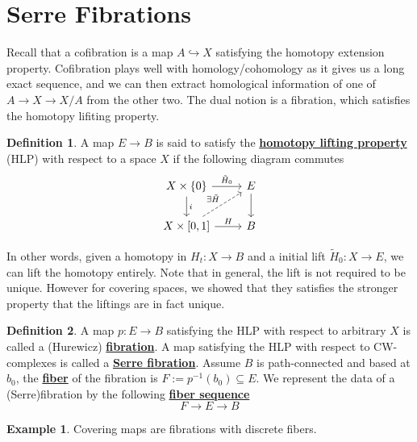 \documentclass{article}
\theoremstyle{definition}
\theoremstyle{definition}
\theoremstyle{definition}
\theoremstyle{definition}
\newtheorem{definition}{Definition}[theorem]
\theoremstyle{definition}
\theoremstyle{definition}
\newtheorem{example}{Example}[theorem]
\begin{document}
\section{Serre Fibrations}
Recall that a cofibration is a map $A\hookrightarrow X$ satisfying the homotopy extension property. Cofibration plays well with homology/cohomology as it gives us a long exact sequence, and we can then extract homological information of one of $A\to X\to X/A$ from the other two. The dual notion is a fibration, which satisfies the homotopy lifiting property.

\begin{tcolorbox}[colback=purple!5!white,colframe=purple!75!black]
\begin{definition}
A map $E\to B$ is said to satisfy the \underline{\textbf{homotopy lifting property}} (HLP) with respect to a space $X$ if the following diagram commutes
\[
\begin{tikzcd}
X\times \{0\}\arrow[r,"\tilde{H}_0"]\arrow[d,"i"]&E\arrow[d]\\
X\times [0,1]\arrow[r,"H"]\arrow[ur,dashed,"\exists \tilde{H}"]&B
\end{tikzcd}    
\]
\end{definition}
\end{tcolorbox}
In other words, given a homotopy in $H_t: X\to B$ and a initial lift $\tilde{H}_0: X\to E$, we can lift the homotopy entirely. Note that in general, the lift is not required to be unique. However for covering spaces, we showed that they satisfies the stronger property that the liftings are in fact unique. 

\begin{tcolorbox}[colback=purple!5!white,colframe=purple!75!black]
\begin{definition}
A map $p:E\to B$ satisfying the HLP with respect to arbitrary $X$ is called a (Hurewicz)  \underline{\textbf{fibration}}. A map satisfying the HLP with respect to CW-complexes is called a \underline{\textbf{Serre fibration}}. Assume $B$ is path-connected and based at $b_0$, the \underline{\textbf{fiber}} of the fibration is $F:=p^{-1}(b_0)\subseteq E$. We represent the data of a (Serre)fibration by the following \underline{\textbf{fiber sequence}}
\[F\to E\to B\]
\end{definition}
\end{tcolorbox}

\begin{tcolorbox}[colback=yellow!5!white,colframe=yellow!30!white]
	\begin{example}
		Covering maps are fibrations with discrete fibers.
	\end{example}
\end{tcolorbox}
\end{document}
